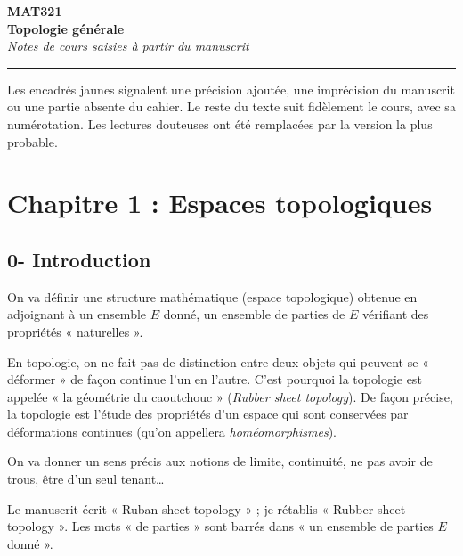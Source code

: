 \documentclass[11pt,a4paper]{article}
\begin{document}
\begin{center}
  {\Huge\bfseries\color{bleu} MAT321}\\[4pt]
  {\LARGE\bfseries\color{bleuclair} Topologie générale}\\[4pt]
  {\large\itshape Notes de cours saisies à partir du manuscrit}
\end{center}
\vspace{-4pt}
\hrule
\vspace{6pt}

\begin{note}
Les encadrés jaunes signalent une précision ajoutée, une imprécision du manuscrit ou une partie absente du cahier. Le reste du texte suit fidèlement le cours, avec sa numérotation.
Les lectures douteuses ont été remplacées par la version la plus probable.
\end{note}

\section*{Chapitre 1 : Espaces topologiques}

\subsection*{0- Introduction}

On va définir une structure mathématique (espace topologique) obtenue en adjoignant à un ensemble $E$ donné, un ensemble de parties de $E$ vérifiant des propriétés « naturelles ».

En topologie, on ne fait pas de distinction entre deux objets qui peuvent se « déformer » de façon continue l'un en l'autre.
C'est pourquoi la topologie est appelée « la géométrie du caoutchouc » (\emph{Rubber sheet topology}).
De façon précise, la topologie est l'étude des propriétés d'un espace qui sont conservées par déformations continues (qu'on appellera \emph{homéomorphismes}).

On va donner un sens précis aux notions de limite, continuité, ne pas avoir de trous, être d'un seul tenant\dots

\begin{note}
Le manuscrit écrit « Ruban sheet topology » ; je rétablis « Rubber sheet topology ». Les mots « de parties » sont barrés dans « un ensemble de parties $E$ donné ».
\end{note}

\end{document}
